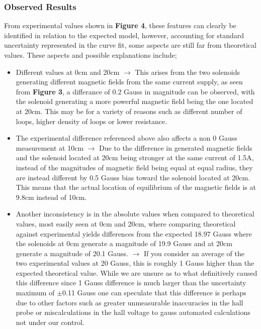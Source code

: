 \documentclass{article}
\begin{document}
   \subsubsection{Observed Results}
   From experimental values shown in \textbf{Figure 4}, these features can clearly be identified in relation to the expected model, however, accounting
   for standard uncertainty represented in the curve fit, some aspects are still far from theoretical values. These aspects and possible explanations include;
   \begin{itemize}
       \item Different values at 0cm and 20cm \(\rightarrow\) This arises from the two solenoids generating different magnetic fields from the same current supply,
       as seen from \textbf{Figure 3}, a differance of 0.2 Gauss in magnitude can be observed, with the solenoid generating a more powerful magnetic field
       being the one located at 20cm. This may be for a variety of reasons such as different number of loops, higher density of loops or lower resistance.
       \item The experimental difference referenced above also affects a non 0 Gauss measurement at 10cm \(\rightarrow\) Due to the difference in generated magnetic fields
       and the solenoid located at 20cm being stronger at the same current of 1.5A, instead of the magnitudes of magnetic field being equal at equal radius, they are instead 
       different by 0.5 Gauss bias toward the solenoid located at 20cm. This means that the actual location of equilibrium of the magnetic fields is at 9.8cm instead of 10cm.
       \item Another inconsistency is in the absolute values when compared to theoretical values, most easily seen at 0cm and 20cm, where comparing theoretical against experimental yields 
       differences from the expected 18.97 Gauss where the solenoids at 0cm generate a magnitude of 19.9 Gauss and at 20cm generate a magnitude of 20.1 Gauss. \(\rightarrow\) If you consider 
       an average of the two experimental values at 20 Gauss, this is roughly 1 Gauss higher than the expected theoretical value. While we are unsure as to what definitively caused this difference 
       since 1 Gauss difference is much larger than the uncertainty maximum of \(\pm\)0.11 Gauss one can speculate that this difference is perhaps due to other factors such as greater unmeasurable inaccuracies
       in the hall probe or miscalculations in the hall voltage to gauss automated calculations not under our control.
   \end{itemize}
\end{document}
